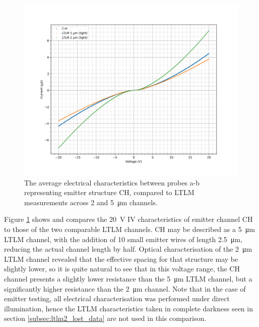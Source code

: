 \begin{refsection}
\begin{figure}[H]
    \centering
    \includegraphics[width=\linewidth]{Chapter7/Figs/Raster/Emitters/20V comparison to LTLM.png}
    \caption{The average electrical characteristics between probes a-b representing emitter structure CH, compared to LTLM measurements across 2 and 5~\si{\micro\metre} channels.}
    \label{fig:e_ch_20v_ltlm}
\end{figure}

Figure \ref{fig:e_ch_20v_ltlm} shows and compares the 20~\si{\volt} IV characteristics of emitter channel CH to those of the two comparable LTLM channels. CH may be described as a 5~\si{\micro\metre} LTLM channel, with the addition of 10 small emitter wires of length 2.5~\si{\micro\metre}, reducing the actual channel length by half. Optical characterisation of the 2~\si{\micro\metre} LTLM channel revealed that the effective spacing for that structure may be slightly lower, so it is quite natural to see that in this voltage range, the CH channel presents a slightly lower resistance than the 5~\si{\micro\metre} LTLM channel, but a significantly higher resistance than the 2~\si{\micro\metre} channel. Note that in the case of emitter testing, all electrical characterisation was performed under direct illumination, hence the LTLM characteristics taken in complete darkness seen in section \ref{subsec:ltlm2_lost_data} are not used in this comparison.


\end{refsection}
